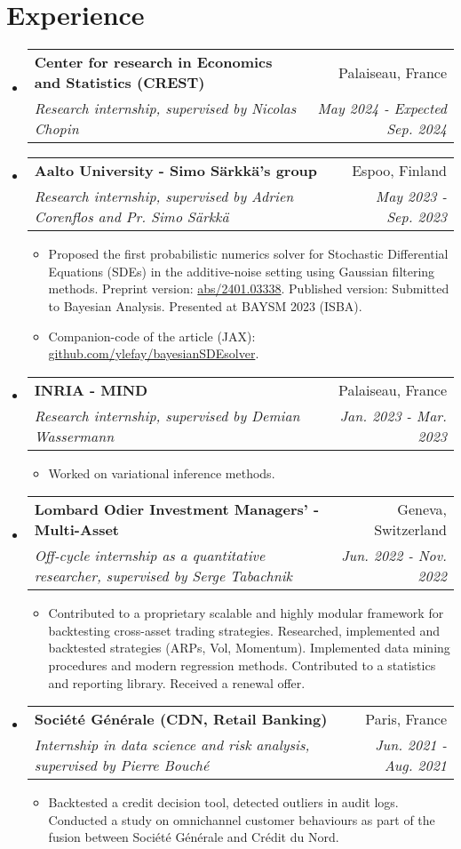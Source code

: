 \documentclass[letterpaper,10pt]{article}
\makeatletter
\newcommand{\up}[1]{\textsuperscript{#1}}
\newcommand{\resumeItem}[1]{
    \item\small{
            {#1 \vspace{-2pt}}
    }
}
\newcommand{\resumeSubheading}[4]{
    \vspace{-2pt}\item
    \begin{tabular*}{0.97\textwidth}[t]{l@{\extracolsep{\fill}}r}
        \textbf{#1}       & #2                 \\
        \textit{\small#3} & \textit{\small #4} \\
    \end{tabular*}\vspace{-7pt}
}
\newcommand{\resumeSubHeadingListStart}{\begin{itemize}[leftmargin=0.15in, label={}]}
\newcommand{\resumeSubHeadingListEnd}{\end{itemize}}
\newcommand{\resumeItemListStart}{\begin{itemize}}
\newcommand{\resumeItemListEnd}{\end{itemize}\vspace{-5pt}}
\makeatother
\begin{document}
\section{Experience}
\resumeSubHeadingListStart
\resumeSubheading
{Center for research in Economics and Statistics (CREST)}{Palaiseau, France}
{Research internship, supervised by Nicolas Chopin}{May 2024 - Expected Sep. 2024}
\resumeSubheading
{Aalto University - Simo Särkkä's group}{Espoo, Finland}
{Research internship, supervised by Adrien Corenflos and Pr. Simo Särkkä}{May 2023 - Sep. 2023}
\resumeItemListStart
\resumeItem{Proposed the first probabilistic numerics solver for Stochastic Differential Equations (SDEs) in the additive-noise setting using Gaussian filtering methods. Preprint version: \href{https://arxiv.org/abs/2401.03338}{abs/2401.03338}. Published version: Submitted to Bayesian Analysis. Presented at BAYSM 2023 (ISBA).}
\resumeItem{Companion-code of the article (JAX): \href{https://github.com/ylefay/bayesianSDEsolver}{github.com/ylefay/bayesianSDEsolver}.}
\resumeItemListEnd
\resumeSubheading
{INRIA - MIND}{Palaiseau, France}
{Research internship, supervised by Demian Wassermann}{Jan. 2023 - Mar. 2023}
\resumeItemListStart
\resumeItem{Worked on variational inference methods.}
\resumeItemListEnd
\resumeSubheading
{Lombard Odier Investment Managers' - Multi-Asset}{Geneva, Switzerland}
{Off-cycle internship as a quantitative researcher, supervised by Serge Tabachnik}{Jun. 2022 - Nov. 2022}
\resumeItemListStart
\resumeItem{Contributed to a proprietary scalable and highly modular framework for backtesting cross-asset trading strategies. Researched, implemented and backtested strategies (ARPs, Vol, Momentum). Implemented data mining procedures and modern regression methods. Contributed to a statistics and reporting library. Received a renewal offer.}
\resumeItemListEnd
\resumeSubheading
{Société Générale (CDN, Retail Banking)}{Paris, France}%
{Internship in data science and risk analysis, supervised by Pierre Bouché}{Jun. 2021 - Aug. 2021}
\resumeItemListStart
\resumeItem{Backtested a credit decision tool, detected outliers in audit logs. Conducted a study on omnichannel customer behaviours as part of the fusion between Société Générale and Crédit du Nord.}
\resumeItemListEnd
\resumeSubHeadingListEnd
\end{document}
